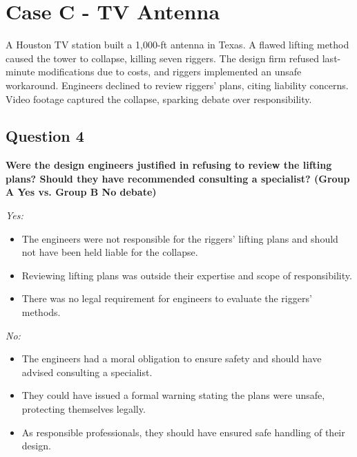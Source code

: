 \documentclass{article}
\begin{document}
\pagebreak
\section*{Case C - TV Antenna}
A Houston TV station built a 1,000-ft antenna in Texas. A flawed lifting method caused the tower to collapse, killing seven riggers. The design firm refused last-minute modifications due to costs, and riggers implemented an unsafe workaround. Engineers declined to review riggers’ plans, citing liability concerns. Video footage captured the collapse, sparking debate over responsibility.

\subsection*{Question 4}
\textbf{Were the design engineers justified in refusing to review the lifting plans? Should they have recommended consulting a specialist? (Group A Yes vs. Group B No debate)}

\textit{Yes:}
\begin{itemize}
    \item The engineers were not responsible for the riggers' lifting plans and should not have been held liable for the collapse.
    \item Reviewing lifting plans was outside their expertise and scope of responsibility.
    \item There was no legal requirement for engineers to evaluate the riggers' methods.
\end{itemize}

\textit{No:}
\begin{itemize}
    \item The engineers had a moral obligation to ensure safety and should have advised consulting a specialist.
    \item They could have issued a formal warning stating the plans were unsafe, protecting themselves legally.
    \item As responsible professionals, they should have ensured safe handling of their design.
\end{itemize}
\end{document}
